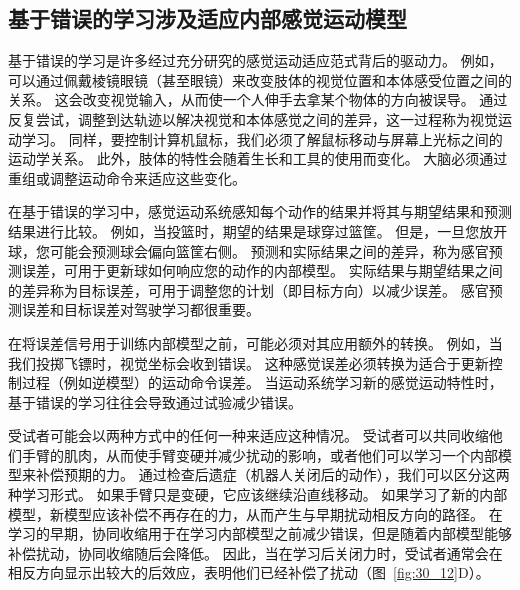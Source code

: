 \subsection{基于错误的学习涉及适应内部感觉运动模型}

基于错误的学习是许多经过充分研究的感觉运动适应范式背后的驱动力。
例如，可以通过佩戴棱镜眼镜（甚至眼镜）来改变肢体的视觉位置和本体感受位置之间的关系。
这会改变视觉输入，从而使一个人伸手去拿某个物体的方向被误导。
通过反复尝试，调整到达轨迹以解决视觉和本体感觉之间的差异，这一过程称为视觉运动学习。
同样，要控制计算机鼠标，我们必须了解鼠标移动与屏幕上光标之间的运动学关系。
此外，肢体的特性会随着生长和工具的使用而变化。
大脑必须通过重组或调整运动命令来适应这些变化。


在基于错误的学习中，感觉运动系统感知每个动作的结果并将其与期望结果和预测结果进行比较。
例如，当投篮时，期望的结果是球穿过篮筐。
但是，一旦您放开球，您可能会预测球会偏向篮筐右侧。
预测和实际结果之间的差异，称为感官预测误差，可用于更新球如何响应您的动作的内部模型。
实际结果与期望结果之间的差异称为目标误差，可用于调整您的计划（即目标方向）以减少误差。
感官预测误差和目标误差对驾驶学习都很重要。


在将误差信号用于训练内部模型之前，可能必须对其应用额外的转换。
例如，当我们投掷飞镖时，视觉坐标会收到错误。
这种感觉误差必须转换为适合于更新控制过程（例如逆模型）的运动命令误差。
当运动系统学习新的感觉运动特性时，基于错误的学习往往会导致通过试验减少错误。


受试者可能会以两种方式中的任何一种来适应这种情况。
受试者可以共同收缩他们手臂的肌肉，从而使手臂变硬并减少扰动的影响，或者他们可以学习一个内部模型来补偿预期的力。
通过检查后遗症（机器人关闭后的动作），我们可以区分这两种学习形式。
如果手臂只是变硬，它应该继续沿直线移动。
如果学习了新的内部模型，新模型应该补偿不再存在的力，从而产生与早期扰动相反方向的路径。
在学习的早期，协同收缩用于在学习内部模型之前减少错误，但是随着内部模型能够补偿扰动，协同收缩随后会降低。
因此，当在学习后关闭力时，受试者通常会在相反方向显示出较大的后效应，表明他们已经补偿了扰动（图~\ref{fig:30_12}D）。



